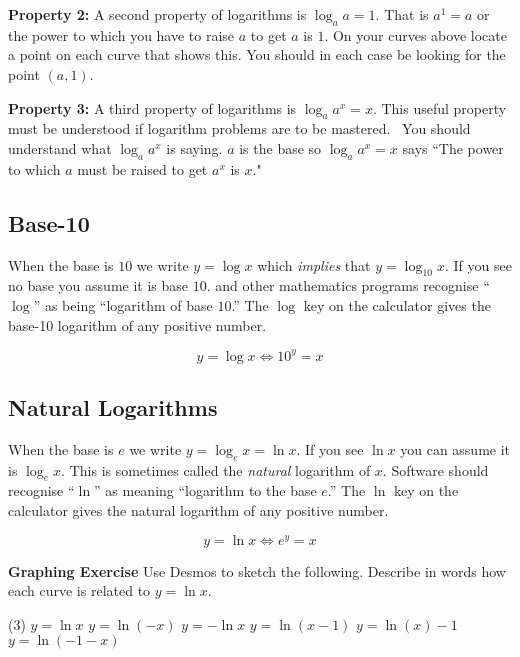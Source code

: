 \textbf{Property 2:} A second property of logarithms is $\log _{a} a =1$. That is $a^{1} =a$ or the power to which you have to raise $a$ to get $a$ is $1$. On your curves above locate a point on each curve that shows this. You
should in each case be looking for the point $\left (a ,1\right )$. 

\textbf{Property 3:} A third property
of logarithms is $\log _{a} a^{x} =x$. This useful property must be understood if logarithm problems are to be mastered.
\ You should understand what $\log _{a} a^{x}$ is saying. $a$ is the base so $\log _{a} a^{x} =x$ says ``The power to which $a$ must be raised to get $a^{x}$ is $x$." 

\subsection*{Base-10}
When the base is $10$ we write $y =\log  x$ which \textit{implies} that $y=\log _{10} x$. If you see no base you assume it is base $10$. \Desmos and other mathematics programs recognise ``$\log $'' as being ``logarithm of base $10$.'' The $\log $ key on the calculator gives the base-10 logarithm of any positive number.
\begin{tcolorbox}
\begin{equation*}y =\log  x \Leftrightarrow 10^{y} =x
\end{equation*}
\end{tcolorbox}


\subsection*{Natural Logarithms}
When the base is $e$ we write $y =\log _{e} x =\ln  x$. If you see $\ln  x$ you can assume it is $\log _{e} x$. This is sometimes called the \emph{natural} logarithm of $x$. Software should recognise ``$\ln $'' as meaning ``logarithm to the base $e$.'' The $\ln $ key on the calculator gives the natural logarithm of any positive number.
\begin{tcolorbox}\begin{equation*}y =\ln  x \Leftrightarrow e^{y} =x
\end{equation*}\end{tcolorbox}

\textbf{Graphing Exercise}
Use Desmos to sketch the following. Describe in words how each curve is related to $y =\ln  x$. 

\begin{tasks}(3)
	\task $y =\ln  x$ 
\task  $y =\ln  ( -x)$ 
\task  $y = -\ln  x$ 
	\task  $y =\ln  (x -1)$ 
	\task  $y =\ln  (x) -1$ 
	\task $y =\ln  ( -1 -x)$ \end{tasks}


